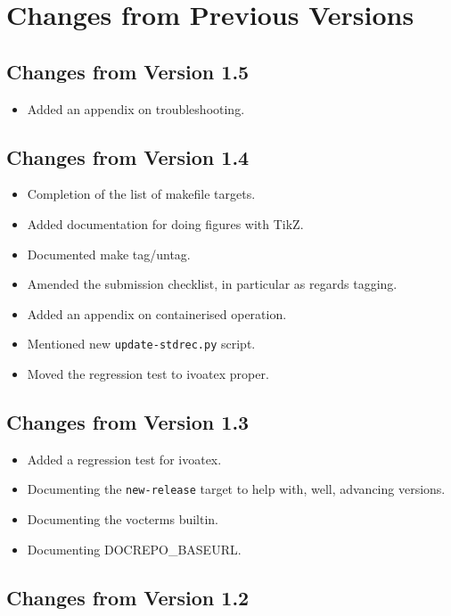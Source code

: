\documentclass[11pt,a4paper]{ivoa}
\begin{document}
\section{Changes from Previous Versions}

\subsection{Changes from Version 1.5}

\begin{itemize}
\item Added an appendix on troubleshooting.
\end{itemize}

\subsection{Changes from Version 1.4}

\begin{itemize}
\item Completion of the list of makefile targets.
\item Added documentation for doing figures with TikZ.
\item Documented make tag/untag.
\item Amended the submission checklist, in particular as regards
tagging.
\item Added an appendix on containerised operation.
\item Mentioned new \verb|update-stdrec.py| script.
\item Moved the regression test to ivoatex proper.
\end{itemize}

\subsection{Changes from Version 1.3}

\begin{itemize}
\item Added a regression test for ivoatex.
\item Documenting the \verb|new-release| target to help with, well, advancing
versions.
\item Documenting the vocterms builtin.
\item Documenting DOCREPO\_BASEURL.
\end{itemize}


\subsection{Changes from Version 1.2}
\end{document}
